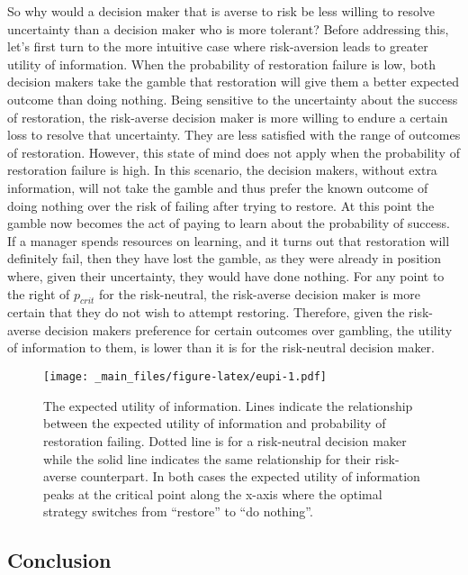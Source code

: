 \documentclass[]{article}
\theoremstyle{definition}
\theoremstyle{definition}
\theoremstyle{definition}
\theoremstyle{remark}
\begin{document}
So why would a decision maker that is averse to risk be less willing to
resolve uncertainty than a decision maker who is more tolerant? Before
addressing this, let's first turn to the more intuitive case where
risk-aversion leads to greater utility of information. When the
probability of restoration failure is low, both decision makers take the
gamble that restoration will give them a better expected outcome than
doing nothing. Being sensitive to the uncertainty about the success of
restoration, the risk-averse decision maker is more willing to endure a
certain loss to resolve that uncertainty. They are less satisfied with
the range of outcomes of restoration. However, this state of mind does
not apply when the probability of restoration failure is high. In this
scenario, the decision makers, without extra information, will not take
the gamble and thus prefer the known outcome of doing nothing over the
risk of failing after trying to restore. At this point the gamble now
becomes the act of paying to learn about the probability of success. If
a manager spends resources on learning, and it turns out that
restoration will definitely fail, then they have lost the gamble, as
they were already in position where, given their uncertainty, they would
have done nothing. For any point to the right of \(p_\textit{crit}\) for
the risk-neutral, the risk-averse decision maker is more certain that
they do not wish to attempt restoring. Therefore, given the risk-averse
decision makers preference for certain outcomes over gambling, the
utility of information to them, is lower than it is for the risk-neutral
decision maker.









\begin{figure}[htbp]
\centering
\texttt{[image: \_main\_files/figure-latex/eupi-1.pdf]}
\caption{\label{fig:eupi}The expected utility of information. Lines indicate the
relationship between the expected utility of information and probability
of restoration failing. Dotted line is for a risk-neutral decision maker
while the solid line indicates the same relationship for their
risk-averse counterpart. In both cases the expected utility of
information peaks at the critical point along the x-axis where the
optimal strategy switches from ``restore'' to ``do nothing''.}
\end{figure}

\subsection*{Conclusion}\label{conclusion}
\end{document}
